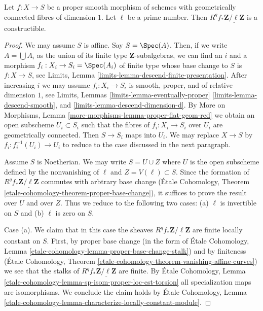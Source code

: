 \begin{lemma}
\label{lemma-proper-smooth-family-curves}
Let $f : X \to S$ be a proper smooth morphism of schemes with
geometrically connected fibres of dimension $1$. Let $\ell$
be a prime number. Then $R^qf_*\underline{\mathbf{Z}/\ell\mathbf{Z}}$
is a constructible.
\end{lemma}

\begin{proof}
We may assume $S$ is affine. Say $S = \Spec(A)$. Then, if we write
$A = \bigcup A_i$ as the union of its finite type $\mathbf{Z}$-subalgebras,
we can find an $i$ and a morphism $f_i : X_i \to S_i = \Spec(A_i)$ of finite
type whose base change to $S$ is $f : X \to S$, see
Limits, Lemma \ref{limits-lemma-descend-finite-presentation}.
After increasing $i$ we may assume $f_i : X_i \to S_i$ is
smooth, proper, and of relative dimension $1$, see
Limits, Lemmas
\ref{limits-lemma-eventually-proper}
\ref{limits-lemma-descend-smooth}, and
\ref{limits-lemma-descend-dimension-d}.
By More on Morphisms, Lemma \ref{more-morphisms-lemma-proper-flat-geom-red}
we obtain an open subscheme $U_i \subset S_i$ such that the fibres
of $f_i : X_i \to S_i$ over $U_i$ are geometrically connected.
Then $S \to S_i$ maps into $U_i$. We may replace $X \to S$
by $f_i : f_i^{-1}(U_i) \to U_i$ to reduce to the case
discussed in the next paragraph.

\medskip\noindent
Assume $S$ is Noetherian. We may write $S = U \cup Z$ where $U$ is the
open subscheme defined by the nonvanishing of $\ell$ and
$Z = V(\ell) \subset S$. Since the formation of
$R^qf_*\underline{\mathbf{Z}/\ell\mathbf{Z}}$ commutes with arbtrary
base change (\'Etale Cohomology, Theorem
\ref{etale-cohomology-theorem-proper-base-change}),
it suffices to prove the result over $U$ and over $Z$.
Thus we reduce to the following two cases: (a) $\ell$
is invertible on $S$ and (b) $\ell$ is zero on $S$.

\medskip\noindent
Case (a). We claim that in this case the sheaves
$R^qf_*\underline{\mathbf{Z}/\ell\mathbf{Z}}$ are
finite locally constant on $S$. First, by proper base change
(in the form of \'Etale Cohomology, Lemma
\ref{etale-cohomology-lemma-proper-base-change-stalk})
and by finiteness 
(\'Etale Cohomology, Theorem
\ref{etale-cohomology-theorem-vanishing-affine-curves})
we see that the stalks of $R^qf_*\underline{\mathbf{Z}/\ell\mathbf{Z}}$
are finite. By \'Etale Cohomology, Lemma
\ref{etale-cohomology-lemma-sp-isom-proper-loc-cst-torsion}
all specialization maps are isomorphisms.
We conclude the claim holds by
\'Etale Cohomology, Lemma
\ref{etale-cohomology-lemma-characterize-locally-constant-module}.


\end{proof}
